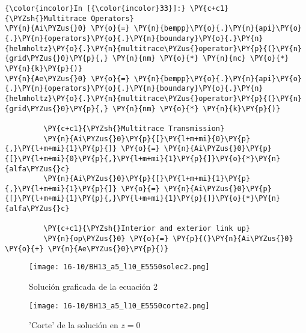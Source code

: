 \documentclass[11pt]{report}
\begin{document}
\begin{tcolorbox}
    \begin{Verbatim}[commandchars=\\\{\}]
{\color{incolor}In [{\color{incolor}33}]:} \PY{c+c1}{\PYZsh{}Multitrace Operators}
\PY{n}{Ai\PYZus{}0} \PY{o}{=} \PY{n}{bempp}\PY{o}{.}\PY{n}{api}\PY{o}{.}\PY{n}{operators}\PY{o}{.}\PY{n}{boundary}\PY{o}{.}\PY{n}{helmholtz}\PY{o}{.}\PY{n}{multitrace\PYZus{}operator}\PY{p}{(}\PY{n}{grid\PYZus{}0}\PY{p}{,} \PY{n}{nm} \PY{o}{*} \PY{n}{nc} \PY{o}{*} \PY{n}{k}\PY{p}{)}
\PY{n}{Ae\PYZus{}0} \PY{o}{=} \PY{n}{bempp}\PY{o}{.}\PY{n}{api}\PY{o}{.}\PY{n}{operators}\PY{o}{.}\PY{n}{boundary}\PY{o}{.}\PY{n}{helmholtz}\PY{o}{.}\PY{n}{multitrace\PYZus{}operator}\PY{p}{(}\PY{n}{grid\PYZus{}0}\PY{p}{,} \PY{n}{nm} \PY{o}{*} \PY{n}{k}\PY{p}{)}
         
         \PY{c+c1}{\PYZsh{}Multitrace Transmission}
         \PY{n}{Ai\PYZus{}0}\PY{p}{[}\PY{l+m+mi}{0}\PY{p}{,}\PY{l+m+mi}{1}\PY{p}{]} \PY{o}{=} \PY{n}{Ai\PYZus{}0}\PY{p}{[}\PY{l+m+mi}{0}\PY{p}{,}\PY{l+m+mi}{1}\PY{p}{]}\PY{o}{*}\PY{n}{alfa\PYZus{}c}
         \PY{n}{Ai\PYZus{}0}\PY{p}{[}\PY{l+m+mi}{1}\PY{p}{,}\PY{l+m+mi}{1}\PY{p}{]} \PY{o}{=} \PY{n}{Ai\PYZus{}0}\PY{p}{[}\PY{l+m+mi}{1}\PY{p}{,}\PY{l+m+mi}{1}\PY{p}{]}\PY{o}{*}\PY{n}{alfa\PYZus{}c}
         
         \PY{c+c1}{\PYZsh{}Interior and exterior link up}
         \PY{n}{op\PYZus{}0} \PY{o}{=} \PY{p}{(}\PY{n}{Ai\PYZus{}0} \PY{o}{+} \PY{n}{Ae\PYZus{}0}\PY{p}{)}
\end{Verbatim}
\end{tcolorbox}
\begin{figure}[H]
\centering
\texttt{[image: 16-10/BH13\_a5\_l10\_E5550solec2.png]}
\caption{Solución graficada de la ecuación 2}
\end{figure}
\begin{figure}[H]
\centering
\texttt{[image: 16-10/BH13\_a5\_l10\_E5550corte2.png]}
\caption{'Corte' de la solución en $z=0$}
\end{figure}
\end{document}
